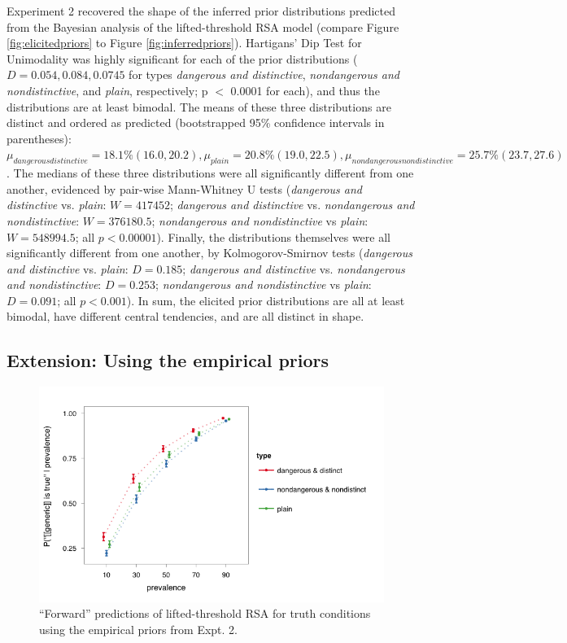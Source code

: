 \documentclass[10pt,letterpaper]{article}
\begin{document}
Experiment 2 recovered the shape of the inferred prior distributions predicted from the Bayesian analysis of the lifted-threshold RSA model (compare Figure \ref{fig:elicitedpriors} to Figure \ref{fig:inferredpriors}). 
%
Hartigans' Dip Test for Unimodality was highly significant for each of the prior distributions ($D = 0.054, 0.084, 0.0745$ for types \emph{dangerous and distinctive}, \emph{nondangerous and nondistinctive}, and \emph{plain}, respectively; p $<$ 0.0001 for each), and thus the distributions are at least bimodal. 
%
The means of these three distributions are distinct and ordered as predicted (bootstrapped 95\% confidence intervals in parentheses): $\mu_{dangerousdistinctive} = 18.1\% (16.0, 20.2), \mu_{plain} = 20.8\% (19.0, 22.5), \mu_{nondangerousnondistinctive} = 25.7\% (23.7, 27.6)$.
%
The medians of these three distributions were all significantly different from one another, evidenced by pair-wise Mann-Whitney U tests (\emph{dangerous and distinctive} vs. \emph{plain}: $W=417452$; \emph{dangerous and distinctive} vs. \emph{nondangerous and nondistinctive}: $W=376180.5$; \emph{nondangerous and nondistinctive} vs \emph{plain}: $W=548994.5$; all $p < 0.00001$). 
%
Finally, the distributions themselves were all significantly different from one another, by Kolmogorov-Smirnov tests (\emph{dangerous and distinctive} vs. \emph{plain}: $D = 0.185$;  \emph{dangerous and distinctive} vs. \emph{nondangerous and nondistinctive}: $D = 0.253$; \emph{nondangerous and nondistinctive} vs \emph{plain}: $D = 0.091$; all $p < 0.001$). In sum, the elicited prior distributions are all at least bimodal, have different central tendencies, and are all distinct in shape.


\subsection{Extension: Using the empirical priors}
\label{sec:emprior}

\begin{figure}
\centering
    \includegraphics[width=\columnwidth]{exp1truthconds_empiricalPriors}
    \caption{``Forward'' predictions of lifted-threshold RSA for truth conditions using the empirical priors from Expt. 2.}
  \label{fig:exp1preds}
\end{figure}
\end{document}
